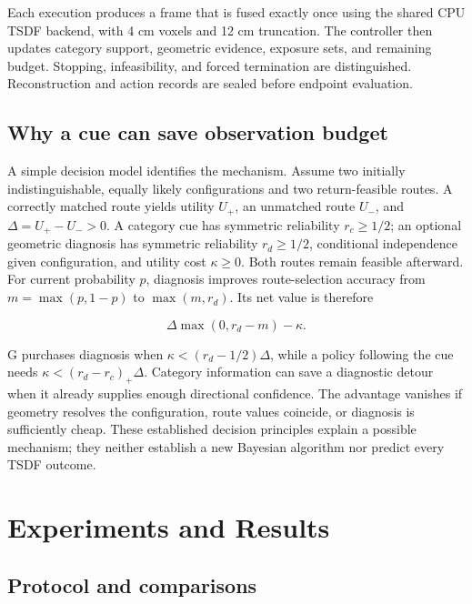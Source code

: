 \documentclass[pdflatex,sn-mathphys-num]{sn-jnl}
\begin{document}
Each execution produces a frame that is fused exactly once using the shared CPU TSDF backend, with 4 cm voxels and 12 cm truncation. The controller then updates category support, geometric evidence, exposure sets, and remaining budget. Stopping, infeasibility, and forced termination are distinguished. Reconstruction and action records are sealed before endpoint evaluation.

\hypertarget{why-a-cue-can-save-observation-budget}{%
\subsection{Why a cue can save observation budget}\label{why-a-cue-can-save-observation-budget}}

A simple decision model identifies the mechanism. Assume two initially indistinguishable, equally likely configurations and two return-feasible routes. A correctly matched route yields utility \(U_+\), an unmatched route \(U_-\), and \(\Delta=U_+-U_->0\). A category cue has symmetric reliability \(r_c\ge1/2\); an optional geometric diagnosis has symmetric reliability \(r_d\ge1/2\), conditional independence given configuration, and utility cost \(\kappa\ge0\). Both routes remain feasible afterward. For current probability \(p\), diagnosis improves route-selection accuracy from \(m=\max(p,1-p)\) to \(\max(m,r_d)\). Its net value is therefore

\[
\Delta\max(0,r_d-m)-\kappa.
\]

G purchases diagnosis when \(\kappa<(r_d-1/2)\Delta\), while a policy following the cue needs \(\kappa<(r_d-r_c)_+\Delta\). Category information can save a diagnostic detour when it already supplies enough directional confidence. The advantage vanishes if geometry resolves the configuration, route values coincide, or diagnosis is sufficiently cheap. These established decision principles \cite{ref12,ref13} explain a possible mechanism; they neither establish a new Bayesian algorithm nor predict every TSDF outcome.

\hypertarget{experiments-and-results}{%
\section{Experiments and Results}\label{experiments-and-results}}

\hypertarget{protocol-and-comparisons}{%
\subsection{Protocol and comparisons}\label{protocol-and-comparisons}}
\end{document}
